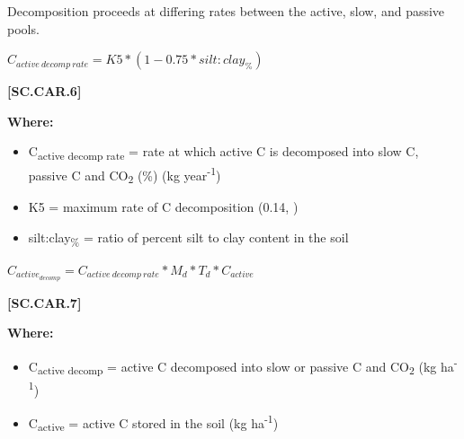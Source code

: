 Decomposition proceeds at differing rates between the active, slow, and passive pools.
        \vspace{0.5cm}

    \begin{center}
\(C_{active\ decomp\ rate}=K5 * (1-0.75 * silt:clay_\%)\)

    \end{center}
        \vspace{0.5cm} 
    
            {\raggedleft \textbf{[SC.CAR.6]}\par}
            \vspace{0.5cm}

        \textbf{Where:}
            
        \begin{itemize}
            \item C\textsubscript{active decomp rate} = rate at which active C is decomposed into slow C, passive C and CO\textsubscript{2} (\%) (kg year\textsuperscript{-1})
            \item K5 = maximum rate of C decomposition (0.14, \cite{parton1987analysis})
            \item silt:clay\textsubscript{\%} = ratio of percent silt to clay content in the soil
        \end{itemize}
        \vspace{0.5cm}

    \begin{center}
\(C_{active_{decomp}}=C_{active\ decomp\ rate} * M_d * T_d * C_{active}\)

    \end{center}
        \vspace{0.5cm} 
    
            {\raggedleft \textbf{[SC.CAR.7]}\par}
            \vspace{0.5cm}

        \textbf{Where:}
            
        \begin{itemize}
            \item C\textsubscript{active decomp} = active C decomposed into slow or passive C and CO\textsubscript{2} (kg ha\textsuperscript{-1})
            \item C\textsubscript{active} = active C stored in the soil (kg ha\textsuperscript{-1})
        \end{itemize}
        \vspace{0.5cm}

